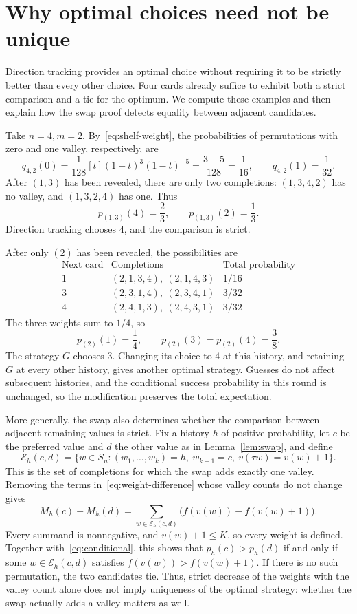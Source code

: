 \documentclass[11pt,reqno]{amsart}
\numberwithin{equation}{section}
\theoremstyle{definition}
\theoremstyle{remark}
\begin{document}
\section{Why optimal choices need not be unique}\label{app:ties}
Direction tracking provides an optimal choice without requiring it to be strictly better than every other choice. Four cards already suffice to exhibit both a strict comparison and a tie for the optimum. We compute these examples and then explain how the swap proof detects equality between adjacent candidates.

Take $n=4,m=2$. By~\eqref{eq:shelf-weight}, the probabilities of permutations with zero and one valley, respectively, are
\[
 q_{4,2}(0)=\frac1{128}[t](1+t)^3(1-t)^{-5}
 =\frac{3+5}{128}=\frac1{16},
 \qquad
 q_{4,2}(1)=\frac1{32}.
\]
After $(1,3)$ has been revealed, there are only two completions: $(1,3,4,2)$ has no valley, and $(1,3,2,4)$ has one. Thus
\[
 p_{(1,3)}(4)=\frac23,\qquad p_{(1,3)}(2)=\frac13.
\]
Direction tracking chooses $4$, and the comparison is strict.

After only $(2)$ has been revealed, the possibilities are
\[
\begin{array}{c|c|c}
\text{Next card}&\text{Completions}&\text{Total probability}\\\hline
1&(2,1,3,4),\ (2,1,4,3)&1/16\\
3&(2,3,1,4),\ (2,3,4,1)&3/32\\
4&(2,4,1,3),\ (2,4,3,1)&3/32
\end{array}
\]
The three weights sum to $1/4$, so
\[
 p_{(2)}(1)=\frac14,\qquad p_{(2)}(3)=p_{(2)}(4)=\frac38.
\]
The strategy $G$ chooses $3$. Changing its choice to $4$ at this history, and retaining $G$ at every other history, gives another optimal strategy. Guesses do not affect subsequent histories, and the conditional success probability in this round is unchanged, so the modification preserves the total expectation.

More generally, the swap also determines whether the comparison between adjacent remaining values is strict. Fix a history $h$ of positive probability, let $c$ be the preferred value and $d$ the other value as in Lemma~\ref{lem:swap}, and define
\[
 \mathcal E_h(c,d)=\{w\in S_n:(w_1,\ldots,w_k)=h,\ w_{k+1}=c,
 \ v(\tau w)=v(w)+1\}.
\]
This is the set of completions for which the swap adds exactly one valley. Removing the terms in~\eqref{eq:weight-difference} whose valley counts do not change gives
\begin{equation}\label{eq:strictness}
 M_h(c)-M_h(d)
 =\sum_{w\in\mathcal E_h(c,d)}\bigl(f(v(w))-f(v(w)+1)\bigr).
\end{equation}
Every summand is nonnegative, and $v(w)+1\le K$, so every weight is defined. Together with~\eqref{eq:conditional}, this shows that $p_h(c)>p_h(d)$ if and only if some $w\in\mathcal E_h(c,d)$ satisfies $f(v(w))>f(v(w)+1)$. If there is no such permutation, the two candidates tie. Thus, strict decrease of the weights with the valley count alone does not imply uniqueness of the optimal strategy: whether the swap actually adds a valley matters as well.
\end{document}
